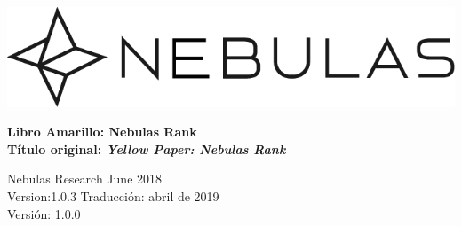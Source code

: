 \documentclass[12pt]{article}
\begin{document}
\pagestyle{empty}

\pagecolor{\pcolor}

\begin{titlepage}
  \begin{center}
    \vspace*{5.5cm}
    \includegraphics[scale=0.5]{../common/Nebulas.png}
    \vspace{0.5cm}


    \textbf{\huge{Libro Amarillo: Nebulas Rank}}\\
    \textbf{Título original: \textit{Yellow Paper: Nebulas Rank}}

    \vspace{0.5cm}
    Nebulas Research
    \vfill
    June 2018\\
    Version:1.0.3
    \vfill
    Traducción: abril de 2019\\
    Versión: 1.0.0
    \textbf{}
  \end{center}

\end{titlepage}
\setcounter{page}{0}
\tableofcontents
\newpage
\setcounter{page}{1}
\pagestyle{fancy}
\vspace*{0.01cm}
\newpage

\newpage
\begin{appendices}
\newpage
\end{appendices}
\end{document}
